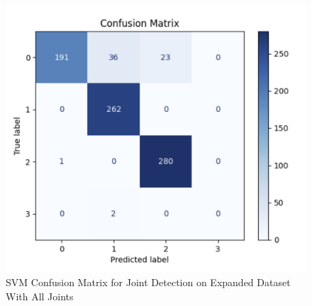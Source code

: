 \documentclass{article}
\begin{document}
\begin{figure}[h]
\vskip -0.1in
\begin{center}
\centerline{\includegraphics[width=\columnwidth]{svm_joint_expanded_all_joints.png}}
\caption{SVM Confusion Matrix for Joint Detection on Expanded Dataset With All Joints}
\end{center}
\vskip -0.3in
\end{figure}
\end{document}
